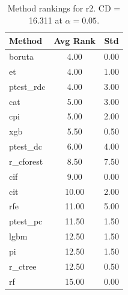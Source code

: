 \begin{table}[h]
\centering
\caption{Method rankings for r2. CD = 16.311 at $\alpha=0.05$.}
\label{tab:ranks_r2}
\begin{tabular}{lcc}
\toprule
Method & Avg Rank & Std \\
\midrule
boruta & 4.00 & 0.00 \\
et & 4.00 & 1.00 \\
ptest_rdc & 4.00 & 3.00 \\
cat & 5.00 & 3.00 \\
cpi & 5.00 & 2.00 \\
xgb & 5.50 & 0.50 \\
ptest_dc & 6.00 & 4.00 \\
r_cforest & 8.50 & 7.50 \\
cif & 9.00 & 0.00 \\
cit & 10.00 & 2.00 \\
rfe & 11.00 & 5.00 \\
ptest_pc & 11.50 & 1.50 \\
lgbm & 12.50 & 1.50 \\
pi & 12.50 & 1.50 \\
r_ctree & 12.50 & 0.50 \\
rf & 15.00 & 0.00 \\
\bottomrule
\end{tabular}
\end{table}